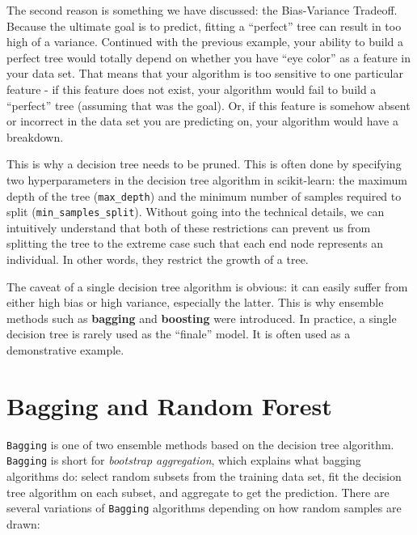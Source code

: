 \documentclass[
]{book}
\theoremstyle{definition}
\theoremstyle{definition}
\theoremstyle{definition}
\theoremstyle{definition}
\theoremstyle{remark}
\begin{document}
The second reason is something we have discussed: the Bias-Variance Tradeoff. Because the ultimate goal is to predict, fitting a ``perfect'' tree can result in too high of a variance. Continued with the previous example, your ability to build a perfect tree would totally depend on whether you have ``eye color'' as a feature in your data set. That means that your algorithm is too sensitive to one particular feature - if this feature does not exist, your algorithm would fail to build a ``perfect'' tree (assuming that was the goal). Or, if this feature is somehow absent or incorrect in the data set you are predicting on, your algorithm would have a breakdown.

This is why a decision tree needs to be pruned. This is often done by specifying two hyperparameters in the decision tree algorithm in scikit-learn: the maximum depth of the tree (\texttt{max\_depth}) and the minimum number of samples required to split (\texttt{min\_samples\_split}). Without going into the technical details, we can intuitively understand that both of these restrictions can prevent us from splitting the tree to the extreme case such that each end node represents an individual. In other words, they restrict the growth of a tree.

The caveat of a single decision tree algorithm is obvious: it can easily suffer from either high bias or high variance, especially the latter. This is why ensemble methods such as \textbf{bagging} and \textbf{boosting} were introduced. In practice, a single decision tree is rarely used as the ``finale'' model. It is often used as a demonstrative example.

\hypertarget{bagging-and-random-forest}{%
\section{Bagging and Random Forest}\label{bagging-and-random-forest}}

\texttt{Bagging} is one of two ensemble methods based on the decision tree algorithm. \texttt{Bagging} is short for \emph{bootstrap aggregation}, which explains what bagging algorithms do: select random subsets from the training data set, fit the decision tree algorithm on each subset, and aggregate to get the prediction. There are several variations of \texttt{Bagging} algorithms depending on how random samples are drawn:
\end{document}
